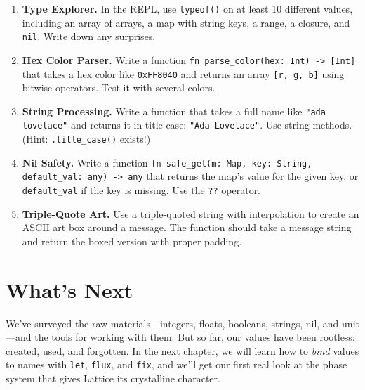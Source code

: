 \begin{enumerate}
  \item \textbf{Type Explorer.}
  In the REPL, use \lstinline|typeof()| on at least 10 different values, including an array of arrays, a map with string keys, a range, a closure, and \lstinline|nil|.
  Write down any surprises.

  \item \textbf{Hex Color Parser.}
  Write a function \lstinline|fn parse_color(hex: Int) -> [Int]| that takes a hex color like \lstinline|0xFF8040| and returns an array \lstinline|[r, g, b]| using bitwise operators.
  Test it with several colors.

  \item \textbf{String Processing.}
  Write a function that takes a full name like \lstinline|"ada lovelace"| and returns it in title case: \lstinline|"Ada Lovelace"|.
  Use string methods.
  (Hint: \lstinline|.title_case()| exists!)

  \item \textbf{Nil Safety.}
  Write a function \lstinline|fn safe_get(m: Map, key: String, default_val: any) -> any| that returns the map's value for the given key, or \lstinline|default_val| if the key is missing.
  Use the \lstinline|??| operator.

  \item \textbf{Triple-Quote Art.}
  Use a triple-quoted string with interpolation to create an ASCII art box around a message.
  The function should take a message string and return the boxed version with proper padding.
\end{enumerate}

\section*{What's Next}\label{sec:ch03-whats-next}

We've surveyed the raw materials---integers, floats, booleans, strings, nil, and unit---and the tools for working with them.
But so far, our values have been rootless: created, used, and forgotten.
In the next chapter, we will learn how to \emph{bind} values to names with \lstinline|let|, \lstinline|flux|, and \lstinline|fix|, and we'll get our first real look at the phase system that gives Lattice its crystalline character.
